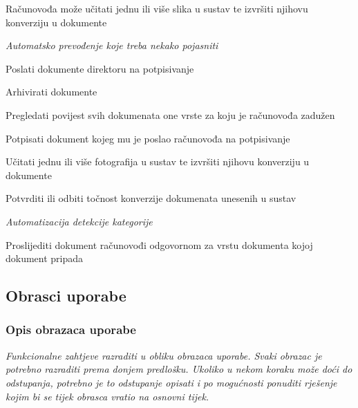 \begin{packed_enum}
\begin{packed_enum}
				\end{packed_enum}
			
				\item  {}
				
				\begin{packed_enum}
					\item Računovođa može učitati jednu ili više slika u sustav te izvršiti njihovu konverziju u dokumente
					\item \textit{Automatsko prevođenje koje treba nekako pojasniti}
					\item Poslati dokumente direktoru na potpisivanje
					\item Arhivirati dokumente
					\item Pregledati povijest svih dokumenata one vrste za koju je računovođa zadužen
				\end{packed_enum}
			
				\item  {}
			
				\begin{packed_enum}
					
					\item Potpisati dokument kojeg mu je poslao računovođa na potpisivanje
					\item Učitati jednu ili više fotografija u sustav te izvršiti njihovu konverziju u dokumente
					\item Potvrditi ili odbiti točnost konverzije dokumenata unesenih u sustav
					\item \textit{Automatizacija detekcije kategorije}
					\item Proslijediti dokument računovođi odgovornom za vrstu dokumenta kojoj dokument pripada
					
				\end{packed_enum}
			
			\end{packed_enum}
			
			\eject 
			
			
				
			\subsection{Obrasci uporabe}
					
				\subsubsection{Opis obrazaca uporabe}
					\textit{Funkcionalne zahtjeve razraditi u obliku obrazaca uporabe. Svaki obrazac je potrebno razraditi prema donjem predlošku. Ukoliko u nekom koraku može doći do odstupanja, potrebno je to odstupanje opisati i po mogućnosti ponuditi rješenje kojim bi se tijek obrasca vratio na osnovni tijek.}\\
					

